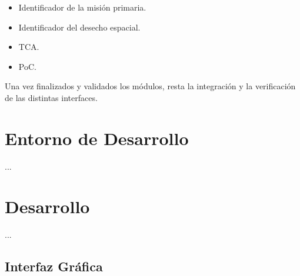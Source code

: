\begin{itemize}
\item Identificador de la  misi\'on primaria.
\item Identificador del desecho espacial.
\item TCA.
\item PoC.
\end{itemize}  

Una vez finalizados y validados los m\'odulos, resta la integraci\'on y la verificaci\'on de las distintas interfaces.\\

\section{Entorno de Desarrollo}
...

\section{Desarrollo}
 ...
  \subsection{Interfaz Gr\'afica}


